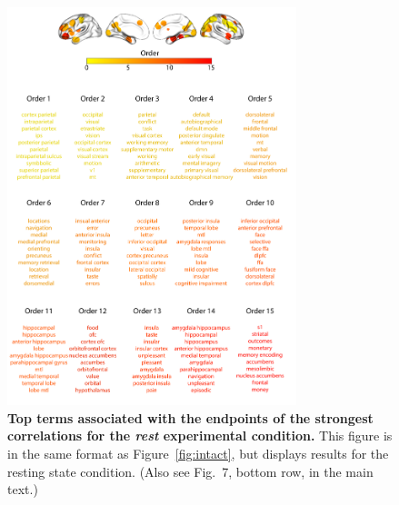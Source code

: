 \documentclass{article}
\newcommand{\neurosynth}{7}
\begin{document}
\begin{figure}[p!]
\centering
\includegraphics[width=0.75\textwidth]{figs/supp_15_rest}
\caption{\textbf{Top terms associated with the endpoints of the
    strongest correlations for the \textit{rest} experimental
    condition.}  This figure is in the same format as
  Figure~\ref{fig:intact}, but displays results for the
  resting state condition.  (Also see Fig.~\neurosynth,
bottom row, in the main text.)}
\label{fig:rest}
\end{figure}
\end{document}
